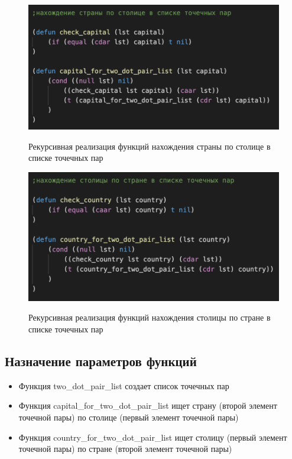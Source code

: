 \documentclass[a4paper,12pt]{article}
\begin{document}
 	\begin{figure}[h!]
	\begin{center}
		{\includegraphics[scale = 0.9]{5.3r2.png}}
		\label{ris:5.3r2}
	\end{center}
\caption{Рекурсивная реализация функций нахождения страны по столице в списке точечных пар}
	\end{figure}


 	\begin{figure}[h!]
	\begin{center}
		{\includegraphics[scale = 0.9]{5.3r3.png}}
		\label{ris:5.3r3}
	\end{center}
\caption{Рекурсивная реализация функций нахождения столицы по стране в списке точечных пар}
\end{figure}
	
	\newpage
 	
 	\subsection*{Назначение параметров функций}
 	
 	 \begin{itemize}
 		\item Функция two\_dot\_pair\_list создает список точечных пар
 		\item Функция capital\_for\_two\_dot\_pair\_list ищет страну (второй элемент точечной пары) по столице (первый элемент точечной пары)
 		\item Функция country\_for\_two\_dot\_pair\_list ищет столицу (первый элемент точечной пары) по стране (второй элемент точечной пары)
 	\end{itemize}
 	
\end{document}
